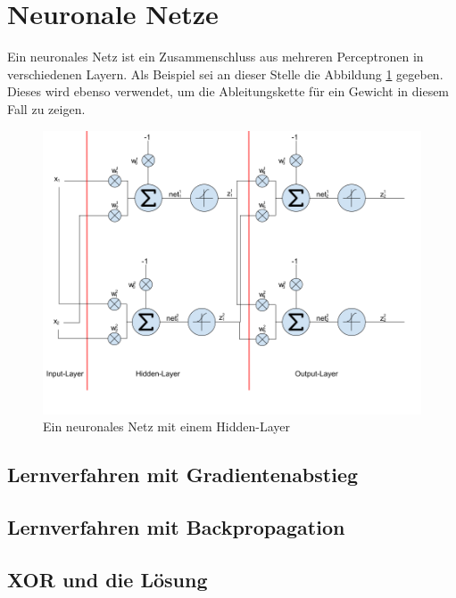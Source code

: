 \section{Neuronale Netze}
Ein neuronales Netz ist ein Zusammenschluss aus mehreren Perceptronen in verschiedenen Layern. Als Beispiel sei an
dieser Stelle die Abbildung \ref{fig:07_neuronal_network} gegeben. Dieses wird ebenso verwendet, um die Ableitungskette
für ein Gewicht in diesem Fall zu zeigen.

\begin{figure}[h!]
    \begin{center}
        \includegraphics[width=1\linewidth]{../common/01_neuronal_network/00_resources/02_neuronales_netz.png}
    \end{center}
    \caption{Ein neuronales Netz mit einem Hidden-Layer}
    \label{fig:07_neuronal_network}
\end{figure}

\subsection{Lernverfahren mit Gradientenabstieg}

\subsection{Lernverfahren mit Backpropagation}

\subsection{XOR und die Lösung}